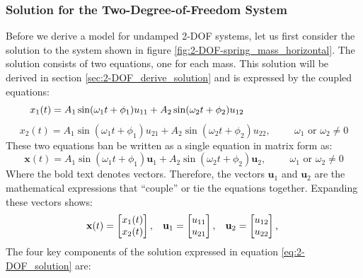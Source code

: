 \documentclass[12pt,letter]{article}
\numberwithin{ex}{section} %
\numberwithin{re}{section} %
\begin{document}
\subsubsection{Solution for the Two-Degree-of-Freedom System}
Before we derive a model for undamped 2-DOF systems, let us first consider the solution to the system shown in figure \ref{fig:2-DOF-spring_mass_horizontal}. The solution consists of two equations, one for each mass. This solution will be derived in section \ref{sec:2-DOF_derive_solution} and is expressed by the coupled equations:
\begin{equation}
	x_1(t) = A_1 \sin (\omega_1 t + \phi_1 )u_{11}+ A_2 \sin (\omega_2 t + \phi_2 )u_{12} \hspace{3.35cm} 
\end{equation}
\begin{equation}
	x_2(t) = A_1 \sin (\omega_1 t + \phi_1 )u_{21}+ A_2 \sin (\omega_2 t + \phi_2 )u_{22} , \hspace{1cm} \omega_1 \text{ or } \omega_2 \neq 0 \nonumber
\end{equation}
These two equations ban be written as a single equation in matrix form as:
\begin{equation}
	\mathbf{x}(t) = A_1 \sin (\omega_1 t + \phi_1 )\mathbf{u}_1 + A_2 \sin (\omega_2 t + \phi_2 )\mathbf{u}_2 , \hspace{1cm} \omega_1 \text{ or } \omega_2 \neq 0
	\label{eq:2-DOF_solution}
\end{equation}
Where the bold text denotes vectors. Therefore, the vectors $\mathbf{u}_1$ and $\mathbf{u}_2$ are the mathematical expressions that ``couple'' or tie the equations together. Expanding these vectors shows: 
\begin{eqnarray}
 \mathbf{x}(t)=  \begin{bmatrix} x_1(t) \\  x_2(t) \end{bmatrix}, \hspace{2ex} \mathbf{u}_1=  \begin{bmatrix} u_{11} \\  u_{21} \end{bmatrix}, \hspace{2ex} \mathbf{u}_2=  \begin{bmatrix} u_{12} \\  u_{22} \end{bmatrix}\text{, }
\end{eqnarray}
The four key components of the solution expressed in equation \ref{eq:2-DOF_solution} are:
\end{document}
